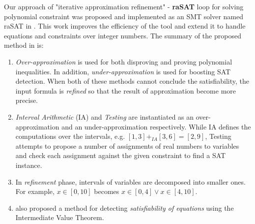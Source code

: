 Our approach of "iterative approximation refinement" - \textbf{raSAT} loop for solving polynomial constraint was proposed and implemented as an SMT solver named raSAT in \cite{VanKhanh201227}. This work improves the efficiency of the tool and extend it to handle equations and constraints over integer numbers. The summary of the proposed method in \cite{VanKhanh201227} is:
\begin{enumerate}
\item \emph{Over-approximation} is used for both disproving and proving polynomial inequalities. In addition, \emph{under-approximation} is used for boosting SAT detection. When both of these methods cannot conclude the satisfiability, the input formula is \emph{refined} so that the result of approximation become more precise. 
\item \emph{Interval Arithmetic} (IA) and \emph{Testing} are instantiated as an over-approximation and an under-approximation respectively. While IA defines the computations over the intervals, e.g. $[1, 3] +_{IA} [3, 6] = [2, 9]$, Testing attempts to propose a number of assignments of real numbers to variables and check each assignment against the given constraint to find a SAT instance.
\item In \emph{refinement} phase, intervals of variables are decomposed into smaller ones. For example, $x \in [0, 10]$ becomes $x \in [0, 4] \vee x \in [4, 10]$.
\item \citet{VanKhanh201227} also proposed a method for detecting \emph{satisfiability of equations} using the Intermediate Value Theorem.
\end{enumerate}

